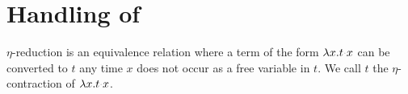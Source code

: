 \documentclass[sigconf,natbib=false,review]{acmart}
\newcommand{\appsep}{\ensuremath{\textcolor{lightgray}{\cdot}}}
\newcommand{\UnifRel}{\ensuremath{\simeq}}
\newcommand{\Ue}{\ensuremath{\UnifRel_\lambda}\xspace}
\begin{document}









\section{Handling of \maybeeta}\label{sec:eta}
$\eta$-reduction is an equivalence relation where a term of the form
$\lambda x.t \appsep x$ can be converted to $t$ any time $x$ does not occur as a
free variable in $t$. We call $t$ the $\eta$-contraction of
$\lambda x. t \appsep x$.
\end{document}
